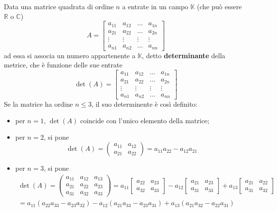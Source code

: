 Data una matrice quadrata di ordine $n$ a entrate in un campo $\mathds{K}$ (che può
essere $\mathds{R}$ o $\mathds{C}$)
\begin{equation*}
  A=
  \begin{bmatrix}
    a_{11} & a_{12} & \dots & a_{1n}\\
    a_{21} & a_{22} & \dots & a_{2n}\\
    \vdots & \vdots & \vdots& \vdots\\
    a_{n1} & a_{n2} & \dots & a_{nn}
  \end{bmatrix}
\end{equation*}
ad essa si associa un numero appartenente a $\mathds{K}$, detto \textbf{determinante}
della metrice, che è funzione delle sue entrate
\begin{equation*}
  \det(A)=
  \begin{bmatrix}
    a_{11} & a_{12} & \dots & a_{1n}\\
    a_{21} & a_{22} & \dots & a_{2n}\\
    \vdots & \vdots & \vdots& \vdots\\
    a_{n1} & a_{n2} & \dots & a_{nn}
  \end{bmatrix}
\end{equation*}
Se la matrice ha ordine $n\leq 3$, il suo determinente è così definito:
\begin{itemize}
\item per $n=1$, $\det(A)$ coincide con l'unico elemento della matrice;
\item per $n=2$, si pone
  \begin{equation*}
    \det(A)=
    \begin{pmatrix}
      a_{11} &a_{12}\\
      a_{21} & a_{22}
    \end{pmatrix}= a_{11}a_{22}-a_{12}a_{21}
  \end{equation*}
\item per $n=3$, si pone
  \begin{eqnarray*}
    \det(A)=
    \begin{pmatrix}
      a_{11} & a_{12} & a_{13}\\
      a_{21} & a_{22} & a_{23}\\
      a_{31} & a_{32} & a_{33}
    \end{pmatrix}= a_{11}
    \begin{bmatrix}
      a_{22} & a_{23}\\
      a_{32} & a_{33}
    \end{bmatrix} - a_{12}
    \begin{bmatrix}
      a_{21} & a_{23}\\
      a_{31} & a_{33}
    \end{bmatrix}+
    a_{13}
    \begin{bmatrix}
      a_{21} & a_{22}\\
      a_{31} & a_{32}
    \end{bmatrix}\\
    = a_{11}(a_{22}a_{33}-a_{23}a_{32})-a_{12}(a_{21}a_{33}-a_{23}a_{31})+a_{13}
    (a_{21}a_{32}-a_{22}a_{31})
  \end{eqnarray*}
\end{itemize}
